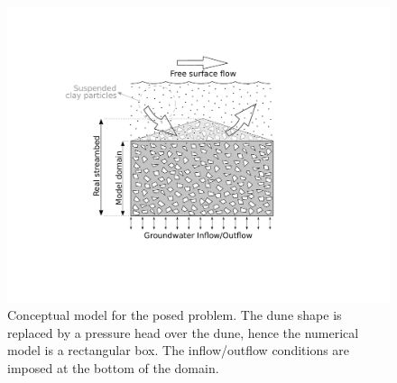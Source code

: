 \documentclass[draft,linenumbers]{agujournal2018}
\begin{document}
\begin{figure}[ht]
\centering
\includegraphics[clip, trim=4.2cm 4.5cm 8cm 3cm, width=28pc]
{1807010Conceptual.pdf}
\caption{Conceptual model for the posed problem. The dune shape is replaced by a pressure head over the dune, hence the numerical model is a rectangular box. The inflow/outflow conditions are imposed at the bottom of the domain.}
\label{Conceptual}
\end{figure}
\end{document}
